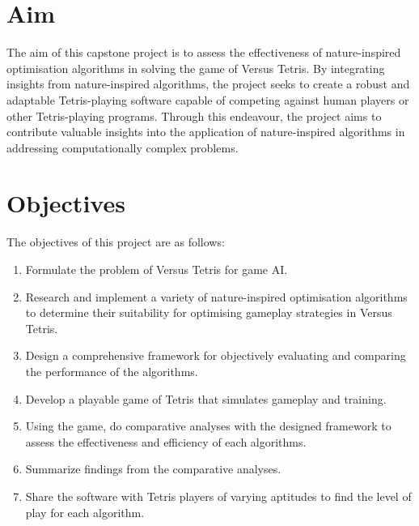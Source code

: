 \documentclass[a4paper, 12pt]{extreport}
\begin{document}
		\section{Aim}
		
			
			The aim of this capstone project is to assess the effectiveness of nature-inspired optimisation algorithms in solving the game of Versus Tetris. By integrating insights from nature-inspired algorithms, the project seeks to create a robust and adaptable Tetris-playing software capable of competing against human players or other Tetris-playing programs. Through this endeavour, the project aims to contribute valuable insights into the application of nature-inspired algorithms in addressing computationally complex problems.
		
		\section{Objectives}
		
			
			The objectives of this project are as follows:
			
			\begin{enumerate}
				\item Formulate the problem of Versus Tetris for game AI.
				\item Research and implement a variety of nature-inspired optimisation algorithms to determine their suitability for optimising gameplay strategies in Versus Tetris.
				\item Design a comprehensive framework for objectively evaluating and comparing the performance of the algorithms.
				\item Develop a playable game of Tetris that simulates gameplay and training.
				\item Using the game, do comparative analyses with the designed framework to assess the effectiveness and efficiency of each algorithms.
				\item Summarize findings from the comparative analyses.
				\item Share the software with Tetris players of varying aptitudes to find the level of play for each algorithm.
			\end{enumerate}
		
\end{document}
